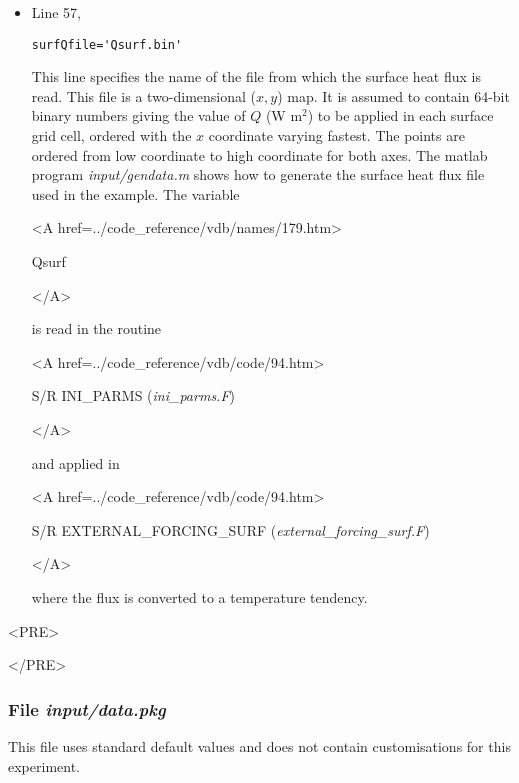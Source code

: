 \begin{itemize}
\item Line 57,
\begin{verbatim}
surfQfile='Qsurf.bin'
\end{verbatim}
This line specifies the name of the file from which the surface heat flux 
is read. This file is a two-dimensional
($x,y$) map. It is assumed to contain 64-bit binary numbers 
giving the value of $Q$ (W m$^2$) to be applied in each surface grid cell, ordered with 
the $x$ coordinate varying fastest. The points are ordered from low coordinate
to high coordinate for both axes. The matlab program
{\it input/gendata.m} shows how to generate the 
surface heat flux file used in the example. 
The variable
{\bf
\begin{rawhtml} <A href=../code_reference/vdb/names/179.htm> \end{rawhtml}
Qsurf 
\begin{rawhtml} </A>\end{rawhtml}
}
is read in the routine
{\it
\begin{rawhtml} <A href=../code_reference/vdb/code/94.htm> \end{rawhtml}
S/R INI\_PARMS ({\it ini\_parms.F})
\begin{rawhtml} </A>\end{rawhtml}
}
and applied in  
{\it
\begin{rawhtml} <A href=../code_reference/vdb/code/94.htm> \end{rawhtml}
S/R EXTERNAL\_FORCING\_SURF ({\it external\_forcing\_surf.F})
\begin{rawhtml} </A>\end{rawhtml}
} where the flux is converted to a temperature tendency.


\end{itemize}


\begin{rawhtml}<PRE>\end{rawhtml}
\begin{small}

\end{small}
\begin{rawhtml}</PRE>\end{rawhtml}


\subsubsection{File {\it input/data.pkg}}
\label{www:tutorials}

This file uses standard default values and does not contain
customisations for this experiment.

